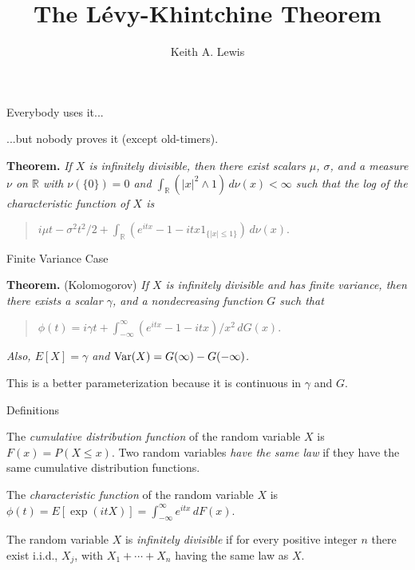 \documentclass[pdf,colorBG,slideColor,blends]{prosper}
\title{The L\'evy-Khintchine Theorem}
\author{Keith A. Lewis}
\newcommand{\RR}{\mathbb{R}}
\newcommand{\Var}{\mathop{\rm Var}}
\begin{document}
\maketitle

\begin{slide}{Everybody uses it...}

...but nobody proves it (except old-timers).

\medskip

{\bf Theorem.} {\it
If $X$ is infinitely divisible, then there exist scalars
$\mu$, $\sigma$, and a measure $\nu$ on $\RR$ with
$\nu(\{0\}) = 0$ and $\int_\RR (|x|^2\wedge 1)\,d\nu(x) < \infty$
such that the log of the characteristic function of $X$ is}

\begin{quote}
$
	i\mu t - \sigma^2 t^2/2
		+ \int_\RR (e^{itx} - 1 - itx 1_{\{|x|\le1\}})\,d\nu(x).
$
\end{quote}

\end{slide}

\begin{slide}{Finite Variance Case}

{\bf Theorem.} (Kolomogorov) {\it
If $X$ is infinitely divisible and has finite variance,
then there exists a scalar
$\gamma$, and a nondecreasing function $G$ such that}

\begin{quote}
$
	\phi(t) = i\gamma t + \int_{-\infty}^\infty (e^{itx} - 1 - itx)/x^2\,dG(x).
$
\end{quote}
{\it Also, $E[X] = \gamma$ and $\Var(X) = G(\infty) - G(-\infty)$.}

\medskip

This is a better parameterization because it is continuous
in $\gamma$ and $G$.

\end{slide}

\begin{slide}{Definitions}

The {\it cumulative distribution function} of the random variable
$X$ is $F(x) = P(X\le x)$.
Two random variables {\it have the same law} if they have the
same cumulative distribution functions.

\medskip

The {\it characteristic function} of the random variable $X$ is
$\phi(t) = E[\exp(itX)] = \int_{-\infty}^\infty e^{itx}\,dF(x)$.

\medskip

The random variable $X$ is {\it infinitely divisible} if for every
positive integer $n$ there exist i.i.d., $X_j$, with
$X_1 + \cdots + X_n$ having the same law as $X$.

\end{slide}
\end{document}
